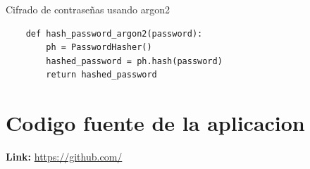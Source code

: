 \documentclass[12pt]{article}
\begin{document}
\large{Cifrado de contraseñas usando argon2}
\begin{verbatim} 
    def hash_password_argon2(password):
        ph = PasswordHasher()
        hashed_password = ph.hash(password)
        return hashed_password
\end{verbatim}

\section{Codigo fuente de la aplicacion}

\large \textbf{Link:}
\url{https://github.com/}
\end{document}
